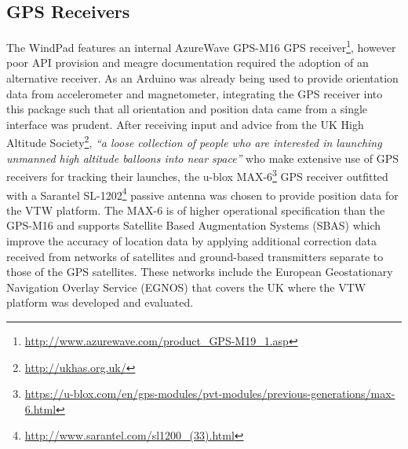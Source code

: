 
\subsection{GPS Receivers}

\newcommand{\azurewaveFootnote}{\footnote{\url{http://www.azurewave.com/product_GPS-M19_1.asp}}}

\newcommand{\habFootnote}{\footnote{\url{http://ukhas.org.uk/}}}

\newcommand{\ubloxFootnote}{\footnote{\url{https://u-blox.com/en/gps-modules/pvt-modules/previous-generations/max-6.html}}}

\newcommand{\sarantelFootnote}{\footnote{\url{http://www.sarantel.com/sl1200_(33).html}}}

\newcommand{\MAXvccFootnote}{\footnote{The MAX-6 requires 2.5 to 3.6V input on VCC, this table showing connection to 5V assumes a MAX-6 breakout with appropriate step down.}}

\newcommand{\MAXserialFootnote}{\footnote{The data pins of the MAX-6 need to be pulled up to between 0.7 to 1.0 of the supply to VCC, so a breakout with appropriate level shifters is required for connection directly to an Ardunio Uno R3's 5V digital pins.}}

\newcommand{\softwareserialFootnote}{\footnote{\url{http://arduino.cc/en/Reference/SoftwareSerial}}}

\newcommand{\maxProtocolFootnote}{\footnote{\url{https://u-blox.com/images/downloads/Product_Docs/u-blox6_ReceiverDescriptionProtocolSpec_(GPS.G6-SW-10018).pdf}}}

\newcommand{\tinygpsFootnote}{\footnote{\url{http://arduiniana.org/libraries/tinygps/}}}


The WindPad features an internal AzureWave GPS-M16 GPS receiver\azurewaveFootnote{}, however poor API provision and meagre documentation required the adoption of an alternative receiver. As an Arduino was already being used to provide orientation data from accelerometer and magnetometer, integrating the GPS receiver into this package such that all orientation and position data came from a single interface was prudent. After receiving input and advice from the UK High Altitude Society\habFootnote{}, \textit{``a loose collection of people who are interested in launching unmanned high altitude balloons into near space''} who make extensive use of GPS receivers for tracking their launches, the u-blox MAX-6\ubloxFootnote{} GPS receiver outfitted with a Sarantel SL-1202\sarantelFootnote{} passive antenna was chosen to provide position data for the VTW platform. The MAX-6 is of higher operational specification than the GPS-M16 and supports Satellite Based Augmentation Systems (SBAS) which improve the accuracy of location data by applying additional correction data received from networks of satellites and ground-based transmitters separate to those of the GPS satellites. These networks include the European Geostationary Navigation Overlay Service (EGNOS) that covers the UK where the VTW platform was developed and evaluated.

